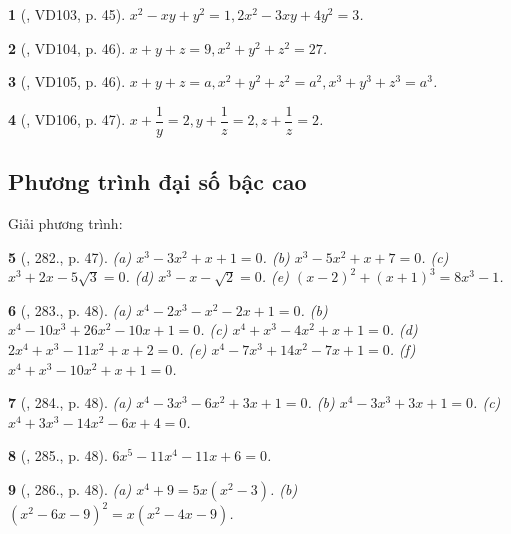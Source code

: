 \documentclass{article}
\newtheorem{baitoan}{}
\begin{document}
\begin{baitoan}[\cite{Binh_Toan_9_tap_2}, VD103, p. 45]
	$x^2 - xy + y^2 = 1,2x^2 - 3xy + 4y^2 = 3$.
\end{baitoan}

\begin{baitoan}[\cite{Binh_Toan_9_tap_2}, VD104, p. 46]
	$x + y + z = 9,x^2 + y^2 + z^2 = 27$.
\end{baitoan}

\begin{baitoan}[\cite{Binh_Toan_9_tap_2}, VD105, p. 46]
	$x + y + z = a,x^2 + y^2 + z^2 = a^2,x^3 + y^3 + z^3 = a^3$.
\end{baitoan}

\begin{baitoan}[\cite{Binh_Toan_9_tap_2}, VD106, p. 47]
	$x + \dfrac{1}{y} = 2,y + \dfrac{1}{z} = 2,z + \dfrac{1}{z} = 2$.
\end{baitoan}

\subsection{Phương trình đại số bậc cao}
Giải phương trình:

\begin{baitoan}[\cite{Binh_Toan_9_tap_2}, 282., p. 47]
	(a) $x^3 - 3x^2 + x + 1 = 0$. (b) $x^3 - 5x^2 + x + 7 = 0$. (c) $x^3 + 2x - 5\sqrt{3} = 0$. (d) $x^3 - x - \sqrt{2} = 0$. (e) $(x - 2)^2 + (x + 1)^3 = 8x^3 - 1$.
\end{baitoan}

\begin{baitoan}[\cite{Binh_Toan_9_tap_2}, 283., p. 48]
	(a) $x^4 - 2x^3 - x^2 - 2x + 1 = 0$. (b) $x^4 - 10x^3 + 26x^2 - 10x + 1 = 0$. (c) $x^4 + x^3 - 4x^2 + x + 1 = 0$. (d) $2x^4 + x^3 - 11x^2 + x + 2 = 0$. (e) $x^4 - 7x^3 + 14x^2 - 7x + 1 = 0$. (f) $x^4 + x^3 - 10x^2 + x + 1 = 0$.
\end{baitoan}

\begin{baitoan}[\cite{Binh_Toan_9_tap_2}, 284., p. 48]
	(a) $x^4 - 3x^3 - 6x^2 + 3x + 1 = 0$. (b) $x^4 - 3x^3 + 3x + 1 = 0$. (c) $x^4 + 3x^3 - 14x^2 - 6x + 4 = 0$.
\end{baitoan}

\begin{baitoan}[\cite{Binh_Toan_9_tap_2}, 285., p. 48]
	$6x^5 - 11x^4 - 11x + 6 = 0$.
\end{baitoan}

\begin{baitoan}[\cite{Binh_Toan_9_tap_2}, 286., p. 48]
	(a) $x^4 + 9 = 5x(x^2 - 3)$. (b) $(x^2 - 6x - 9)^2 = x(x^2 - 4x - 9)$.
\end{baitoan}
\end{document}
